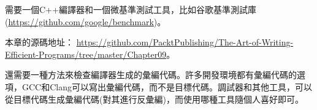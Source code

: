 需要一個C++編譯器和一個微基準測試工具，比如谷歌基準測試庫(\url{https://github.com/google/benchmark})。 

本章的源碼地址： \url{https://github.com/PacktPublishing/The-Art-of-Writing-Efficient-Programs/tree/master/Chapter09}。

還需要一種方法來檢查編譯器生成的彙編代碼。許多開發環境都有彙編代碼的選項，GCC和Clang可以寫出彙編代碼，而不是目標代碼。調試器和其他工具，可以從目標代碼生成彙編代碼(對其進行反彙編)，而使用哪種工具隨個人喜好即可。